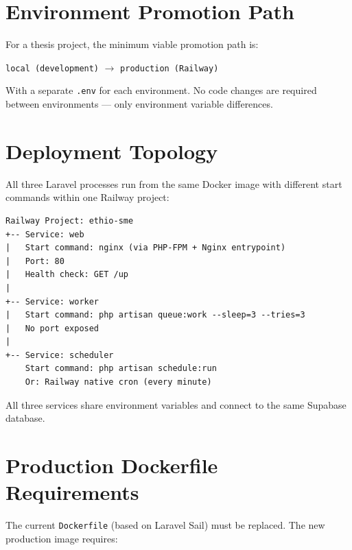 \documentclass[12pt,a4paper]{report}
\begin{document}
\section{Environment Promotion Path}

For a thesis project, the minimum viable promotion path is:

\begin{center}
\texttt{local (development)} \(\longrightarrow\) \texttt{production (Railway)}
\end{center}

With a separate \texttt{.env} for each environment. No code changes
are required between environments — only environment variable
differences.

\section{Deployment Topology}

All three Laravel processes run from the same Docker image with
different start commands within one Railway project:

\begin{lstlisting}[caption={Railway project service layout}]
Railway Project: ethio-sme
+-- Service: web
|   Start command: nginx (via PHP-FPM + Nginx entrypoint)
|   Port: 80
|   Health check: GET /up
|
+-- Service: worker
|   Start command: php artisan queue:work --sleep=3 --tries=3
|   No port exposed
|
+-- Service: scheduler
    Start command: php artisan schedule:run
    Or: Railway native cron (every minute)
\end{lstlisting}

All three services share environment variables and connect to the
same Supabase database.

\section{Production Dockerfile Requirements}

The current \texttt{Dockerfile} (based on Laravel Sail) must be
replaced. The new production image requires:
\end{document}
